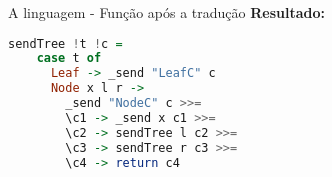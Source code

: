 \begin{frame}[fragile]{A linguagem - Função após a tradução}
  \textbf{Resultado:}
  \vskip 0.5cm
  \begin{lstlisting}[language=Haskell]
  sendTree !t !c =
    case t of 
      Leaf -> _send "LeafC" c 
      Node x l r ->
        _send "NodeC" c >>=
        \c1 -> _send x c1 >>=
        \c2 -> sendTree l c2 >>=
        \c3 -> sendTree r c3 >>=
        \c4 -> return c4 
   \end{lstlisting}
\end{frame}



